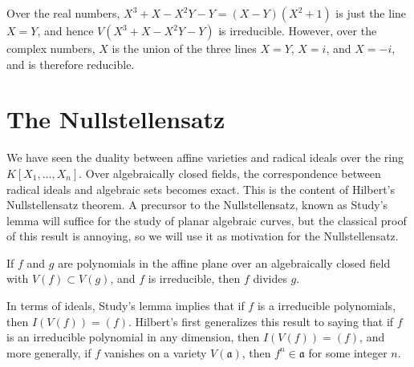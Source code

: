 \begin{example}
    Over the real numbers, $X^3 + X - X^2Y - Y = (X-Y)(X^2 + 1)$ is just the line $X = Y$, and hence $V(X^3 + X - X^2Y - Y)$ is irreducible. However, over the complex numbers, $X$ is the union of the three lines $X = Y$, $X = i$, and $X = -i$, and is therefore reducible.
\end{example}

\section{The Nullstellensatz}

We have seen the duality between affine varieties and radical ideals over the ring $K[X_1, \dots, X_n]$. Over algebraically closed fields, the correspondence between radical ideals and algebraic sets becomes exact. This is the content of Hilbert's Nullstellensatz theorem. A precursor to the Nullstellensatz, known as Study's lemma will suffice for the study of planar algebraic curves, but the classical proof of this result is annoying, so we will use it as motivation for the Nullstellensatz.

\begin{theorem}[Study]
    If $f$ and $g$ are polynomials in the affine plane over an algebraically closed field with $V(f) \subset V(g)$, and $f$ is irreducible, then $f$ divides $g$.
\end{theorem}

In terms of ideals, Study's lemma implies that if $f$ is a irreducible polynomials, then $I(V(f)) = (f)$. Hilbert's first generalizes this result to saying that if $f$ is an irreducible polynomial in any dimension, then $I(V(f)) = (f)$, and more generally, if $f$ vanishes on a variety $V(\mathfrak{a})$, then $f^n \in \mathfrak{a}$ for some integer $n$.

